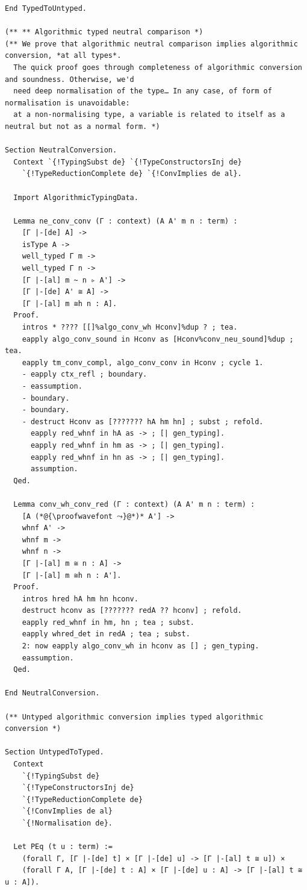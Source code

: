 \begin{lstlisting}
End TypedToUntyped.

(** ** Algorithmic typed neutral comparison *)
(** We prove that algorithmic neutral comparison implies algorithmic conversion, *at all types*.
  The quick proof goes through completeness of algorithmic conversion and soundness. Otherwise, we'd
  need deep normalisation of the type… In any case, of form of normalisation is unavoidable:
  at a non-normalising type, a variable is related to itself as a neutral but not as a normal form. *)

Section NeutralConversion.
  Context `{!TypingSubst de} `{!TypeConstructorsInj de}
    `{!TypeReductionComplete de} `{!ConvImplies de al}.

  Import AlgorithmicTypingData.
  
  Lemma ne_conv_conv (Γ : context) (A A' m n : term) :
    [Γ |-[de] A] ->
    isType A ->
    well_typed Γ m ->
    well_typed Γ n ->
    [Γ |-[al] m ~ n ▹ A'] ->
    [Γ |-[de] A' ≅ A] ->
    [Γ |-[al] m ≅h n : A].
  Proof.
    intros * ???? [[]%algo_conv_wh Hconv]%dup ? ; tea.
    eapply algo_conv_sound in Hconv as [Hconv%conv_neu_sound]%dup ; tea.
    eapply tm_conv_compl, algo_conv_conv in Hconv ; cycle 1.
    - eapply ctx_refl ; boundary.
    - eassumption.
    - boundary.
    - boundary.
    - destruct Hconv as [??????? hA hm hn] ; subst ; refold.
      eapply red_whnf in hA as -> ; [| gen_typing].
      eapply red_whnf in hm as -> ; [| gen_typing].
      eapply red_whnf in hn as -> ; [| gen_typing].
      assumption.
  Qed.

  Lemma conv_wh_conv_red (Γ : context) (A A' m n : term) :
    [A (*@{\proofwavefont ⤳}@*)* A'] ->
    whnf A' ->
    whnf m ->
    whnf n ->
    [Γ |-[al] m ≅ n : A] ->
    [Γ |-[al] m ≅h n : A'].
  Proof.
    intros hred hA hm hn hconv.
    destruct hconv as [??????? redA ?? hconv] ; refold.
    eapply red_whnf in hm, hn ; tea ; subst.
    eapply whred_det in redA ; tea ; subst.
    2: now eapply algo_conv_wh in hconv as [] ; gen_typing.
    eassumption.
  Qed.

End NeutralConversion.

(** Untyped algorithmic conversion implies typed algorithmic conversion *)

Section UntypedToTyped.
  Context
    `{!TypingSubst de}
    `{!TypeConstructorsInj de}
    `{!TypeReductionComplete de}
    `{!ConvImplies de al}
    `{!Normalisation de}.

  Let PEq (t u : term) :=
    (forall Γ, [Γ |-[de] t] × [Γ |-[de] u] -> [Γ |-[al] t ≅ u]) ×
    (forall Γ A, [Γ |-[de] t : A] × [Γ |-[de] u : A] -> [Γ |-[al] t ≅ u : A]).


\end{lstlisting}
